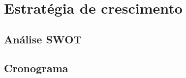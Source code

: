 \chapter{Estratégia de crescimento} 

\cite{porter2003competitive}

\cite{porter2008competition}

\cite{weston2000fundamentos}


\section{Análise SWOT}

\section{Cronograma}
